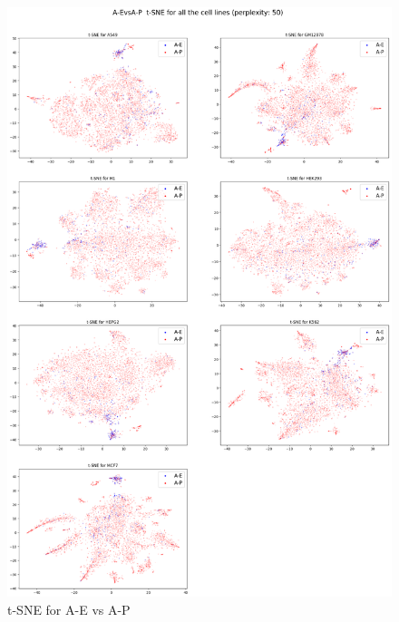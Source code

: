\begin{figure}[h]
\centering
\includegraphics[width=12cm]{images/tsne_decomp_plots/20200410-232525_A-EvsA-P_tsne_plot.png}
\caption{t-SNE for A-E vs A-P}
\label{fig:tsneAEvsAP}
\end{figure}

